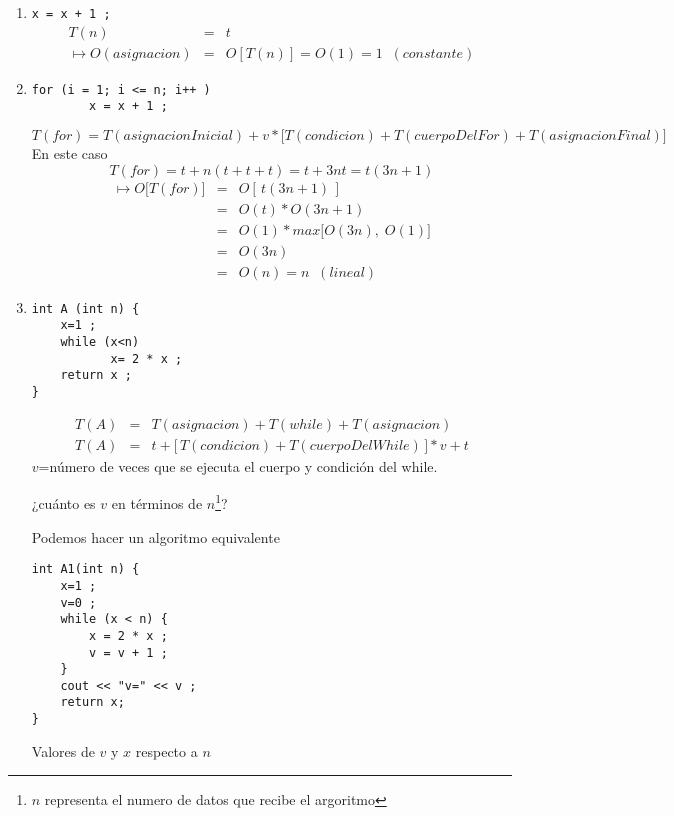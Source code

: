 \begin{enumerate}
\item \verb|x = x + 1 ;|
  \begin{eqnarray*}
    T(n)  &=& t\\
    \mapsto O(asignacion) &=& O [ T(n) ] = O(1) = 1\;\;   (constante)
  \end{eqnarray*}
\item
\begin{verbatim}
for (i = 1; i <= n; i++ )
        x = x + 1 ;
\end{verbatim}
  $$T(for) =  T(asignacionInicial) + v * \bigl[ T(condicion) + T (cuerpoDelFor) + T (asignacionFinal) \bigr] $$
  En este caso
  $$ T (for) = t + n ( t + t + t) =  t + 3nt = t(3n+1)$$
  \begin{eqnarray*}
    \mapsto O \bigl[ T(for) \bigr] &=& O[\,t(3n+1)\,] \\
    &=& O(t)*O(3n+1) \\
    &=& O(1)*max\bigl[O(3n),\;O(1)\bigr] \\
    &=& O(3n) \\
    &=& O(n) = n\;\; (lineal)
  \end{eqnarray*}
\item
\begin{verbatim}
int A (int n) {
    x=1 ;
    while (x<n)
           x= 2 * x ;
    return x ;
}
\end{verbatim}
  \begin{eqnarray*}
  T(A) &=& T(asignacion) + T(while) + T(asignacion)\\
  T(A) &=& t +  \bigl[\, T(condicion) + T(cuerpoDelWhile) \,\bigr] * v + t
\end{eqnarray*}
$v$=número de veces que se ejecuta el cuerpo y condición del while.

¿cuánto es $v$ en términos de $n$\footnote{$n$ representa el numero de datos que recibe el argoritmo}?

Podemos hacer un algoritmo equivalente
\begin{verbatim}
int A1(int n) {
    x=1 ;
    v=0 ;
    while (x < n) {
        x = 2 * x ;
        v = v + 1 ;
    }
    cout << "v=" << v ;
    return x;
}
\end{verbatim}
Valores de $v$ y $x$ respecto a $n$


\end{enumerate}

